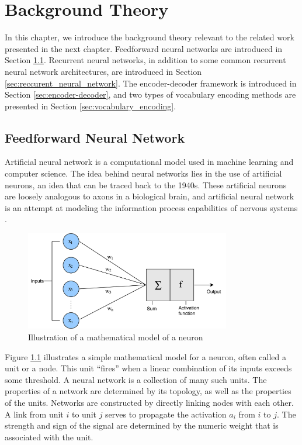 
\chapter{Background Theory}
\label{ch:background}
In this chapter, we introduce the background theory relevant to the related work presented in the next chapter. Feedforward neural networks are introduced in Section \ref{sec:feedforward_neural_network}. Recurrent neural networks, in addition to some common recurrent neural network architectures, are introduced in Section \ref{sec:reccurent_neural_network}. The encoder-decoder framework is introduced in Section \ref{sec:encoder-decoder}, and two types of vocabulary encoding methods are presented in Section \ref{sec:vocabulary_encoding}.


\section{Feedforward Neural Network}
\label{sec:feedforward_neural_network}
Artificial neural network is a computational model used in machine learning and computer science. The idea behind neural networks lies in the use of artificial neurons, an idea that can be traced back to the 1940s. These artificial neurons are loosely analogous to axons in a biological brain, and artificial neural network is an attempt at modeling the information process capabilities of nervous systems \citep[pp.~727--728]{russell2010aimodernapproach}.

\begin{figure}[h]
    \centering
    \includegraphics[width=0.8\textwidth]{fig/related_work/perceptron.png}
    \caption{Illustration of a mathematical model of a neuron}
    \label{fig:nn-perceptron}
\end{figure}

Figure \ref{fig:nn-perceptron} illustrates a simple mathematical model for a neuron, often called a unit or a node. This unit ``fires'' when a linear combination of its inputs exceeds some threshold. A neural network is a collection of many such units. The properties of a network are determined by its topology, as well as the properties of the units. Networks are constructed by directly linking nodes with each other. A link from unit \(i\) to unit \(j\) serves to propagate the activation \(a_{i}\) from \(i\) to \(j\). The strength and sign of the signal are determined by the numeric weight that is associated with the unit. 

